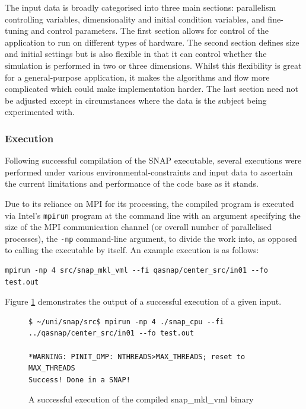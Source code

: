 \documentclass[conference]{IEEEtran}
\begin{document}
The input data is broadly categorised into three main sections: parallelism controlling variables, dimensionality and initial condition variables, and fine-tuning and control parameters. The first section allows for control of the application to run on different types of hardware. The second section defines size and initial settings but is also flexible in that it can control whether the simulation is performed in two or three dimensions. Whilst this flexibility is great for a general-purpose application, it makes the algorithms and flow more complicated which could make implementation harder. The last section need not be adjusted except in circumstances where the data is the subject being experimented with.

\subsubsection{Execution}

Following successful compilation of the SNAP executable, several executions were performed under various environmental-constraints and input data to ascertain the current limitations and performance of the code base as it stands.

Due to its reliance on MPI for its processing, the compiled program is executed via Intel's \texttt{mpirun} program at the command line with an argument specifying the size of the MPI communication channel (or overall number of parallelised processes), the \texttt{-np} command-line argument, to divide the work into, as opposed to calling the executable by itself. An example execution is as follows:

\begin{lstlisting}[breaklines]
mpirun -np 4 src/snap_mkl_vml --fi qasnap/center_src/in01 --fo test.out
\end{lstlisting}

Figure \ref{fig:snap-successful-run} demonstrates the output of a successful execution of a given input.

\begin{figure}[!h]
    \centering
    \begin{lstlisting}[breaklines]
$ ~/uni/snap/src$ mpirun -np 4 ./snap_cpu --fi ../qasnap/center_src/in01 --fo test.out

*WARNING: PINIT_OMP: NTHREADS>MAX_THREADS; reset to MAX_THREADS
Success! Done in a SNAP!
    \end{lstlisting}
    \caption{A successful execution of the compiled snap\_mkl\_vml binary}
    \label{fig:snap-successful-run}
\end{figure}
\end{document}

